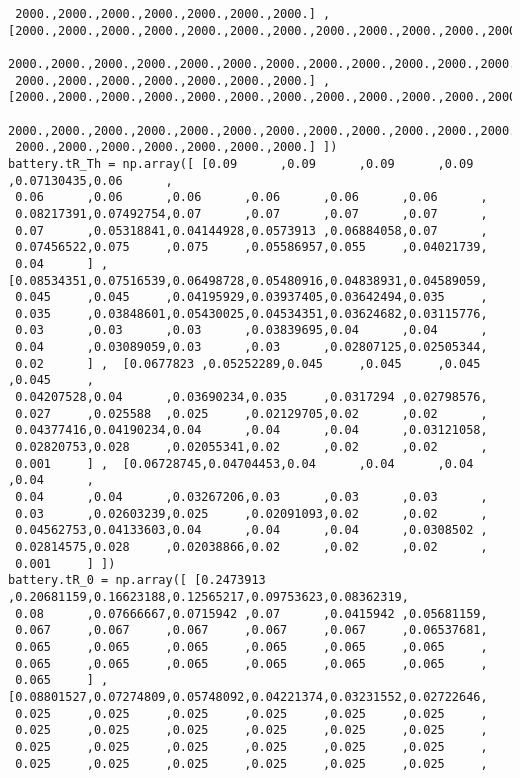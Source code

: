 \begin{verbatim}
 2000.,2000.,2000.,2000.,2000.,2000.,2000.] ,  [2000.,2000.,2000.,2000.,2000.,2000.,2000.,2000.,2000.,2000.,2000.,2000.,
 2000.,2000.,2000.,2000.,2000.,2000.,2000.,2000.,2000.,2000.,2000.,2000.,
 2000.,2000.,2000.,2000.,2000.,2000.,2000.] ,  [2000.,2000.,2000.,2000.,2000.,2000.,2000.,2000.,2000.,2000.,2000.,2000.,
 2000.,2000.,2000.,2000.,2000.,2000.,2000.,2000.,2000.,2000.,2000.,2000.,
 2000.,2000.,2000.,2000.,2000.,2000.,2000.] ])
battery.tR_Th = np.array([ [0.09      ,0.09      ,0.09      ,0.09      ,0.07130435,0.06      ,
 0.06      ,0.06      ,0.06      ,0.06      ,0.06      ,0.06      ,
 0.08217391,0.07492754,0.07      ,0.07      ,0.07      ,0.07      ,
 0.07      ,0.05318841,0.04144928,0.0573913 ,0.06884058,0.07      ,
 0.07456522,0.075     ,0.075     ,0.05586957,0.055     ,0.04021739,
 0.04      ] ,  [0.08534351,0.07516539,0.06498728,0.05480916,0.04838931,0.04589059,
 0.045     ,0.045     ,0.04195929,0.03937405,0.03642494,0.035     ,
 0.035     ,0.03848601,0.05430025,0.04534351,0.03624682,0.03115776,
 0.03      ,0.03      ,0.03      ,0.03839695,0.04      ,0.04      ,
 0.04      ,0.03089059,0.03      ,0.03      ,0.02807125,0.02505344,
 0.02      ] ,  [0.0677823 ,0.05252289,0.045     ,0.045     ,0.045     ,0.045     ,
 0.04207528,0.04      ,0.03690234,0.035     ,0.0317294 ,0.02798576,
 0.027     ,0.025588  ,0.025     ,0.02129705,0.02      ,0.02      ,
 0.04377416,0.04190234,0.04      ,0.04      ,0.04      ,0.03121058,
 0.02820753,0.028     ,0.02055341,0.02      ,0.02      ,0.02      ,
 0.001     ] ,  [0.06728745,0.04704453,0.04      ,0.04      ,0.04      ,0.04      ,
 0.04      ,0.04      ,0.03267206,0.03      ,0.03      ,0.03      ,
 0.03      ,0.02603239,0.025     ,0.02091093,0.02      ,0.02      ,
 0.04562753,0.04133603,0.04      ,0.04      ,0.04      ,0.0308502 ,
 0.02814575,0.028     ,0.02038866,0.02      ,0.02      ,0.02      ,
 0.001     ] ])
battery.tR_0 = np.array([ [0.2473913 ,0.20681159,0.16623188,0.12565217,0.09753623,0.08362319,
 0.08      ,0.07666667,0.0715942 ,0.07      ,0.0415942 ,0.05681159,
 0.067     ,0.067     ,0.067     ,0.067     ,0.067     ,0.06537681,
 0.065     ,0.065     ,0.065     ,0.065     ,0.065     ,0.065     ,
 0.065     ,0.065     ,0.065     ,0.065     ,0.065     ,0.065     ,
 0.065     ] ,  [0.08801527,0.07274809,0.05748092,0.04221374,0.03231552,0.02722646,
 0.025     ,0.025     ,0.025     ,0.025     ,0.025     ,0.025     ,
 0.025     ,0.025     ,0.025     ,0.025     ,0.025     ,0.025     ,
 0.025     ,0.025     ,0.025     ,0.025     ,0.025     ,0.025     ,
 0.025     ,0.025     ,0.025     ,0.025     ,0.025     ,0.025     ,

\end{verbatim}
